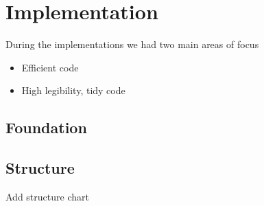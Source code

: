 \chapter{Implementation} \label{sec:implementation}
During the implementations we had two main areas of focus
\begin{itemize}
	\item Efficient code
	\item High legibility, tidy code
\end{itemize}

\section{Foundation} \label{subsec:foundation}
\section{Structure} \label{subsec:structure}
Add structure chart
